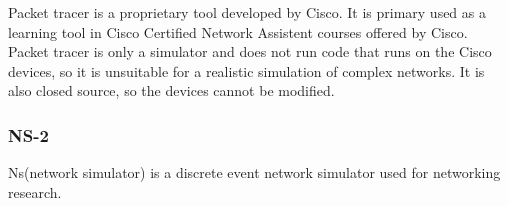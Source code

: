 Packet tracer is a proprietary tool developed by Cisco. It is primary used as a learning tool
in Cisco Certified Network Assistent courses offered by Cisco.
Packet tracer is only a simulator and does not run code that runs on the Cisco devices, so
it is unsuitable for a realistic simulation of complex networks. It is also closed source, so
the devices cannot be modified.


\subsubsection{NS-2}
Ns(network simulator) is a discrete event network simulator used for networking research.
